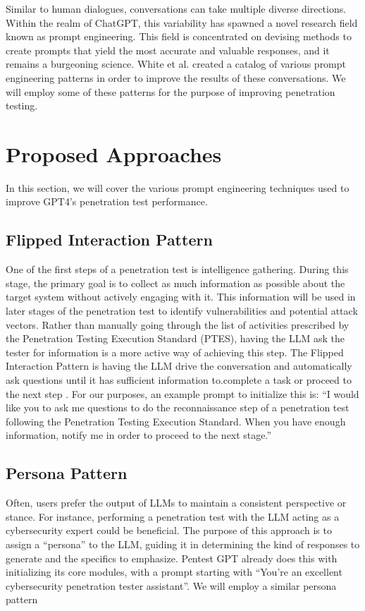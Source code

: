 \documentclass[conference]{IEEEtran}
\begin{document}
Similar to human dialogues, conversations can take multiple diverse directions. Within the realm of ChatGPT, this variability has spawned a novel research field known as prompt engineering. This field is concentrated on devising methods to create prompts that yield the most accurate and valuable responses, and it remains a burgeoning science. White et al. created a catalog of various prompt engineering patterns in order to improve the results of these conversations\cite{white2023prompt}. We will employ some of these patterns for the purpose of improving penetration testing.

\section{Proposed Approaches} \label{sec:approach}
In this section, we will cover the various prompt engineering techniques used to improve GPT4's penetration test performance.

\subsection{Flipped Interaction Pattern} \label{ssec:flipped}
One of the first steps of a penetration test is intelligence gathering\cite{ptes}. During this stage, the primary goal is to collect as much information as possible about the target system without actively engaging with it. This information will be used in later stages of the penetration test to identify vulnerabilities and potential attack vectors. Rather than manually going through the list of activities prescribed by the Penetration Testing Execution Standard (PTES), having the LLM ask the tester for information is a more active way of achieving this step. The Flipped Interaction Pattern is having the LLM drive the conversation and automatically ask questions until it has sufficient information to.complete a task or proceed to the next step \cite{white2023prompt}. For our purposes, an example prompt to initialize this is: “I would like you to ask me questions to do the reconnaissance step of a penetration test following the Penetration Testing Execution Standard. When you have enough information, notify me in order to proceed to the next stage.”

\subsection{Persona Pattern} \label{ssec:persona}
Often, users prefer the output of LLMs to maintain a consistent perspective or stance. For instance, performing a penetration test with the LLM acting as a cybersecurity expert could be beneficial. The purpose of this approach is to assign a “persona” to the LLM, guiding it in determining the kind of responses to generate and the specifics to emphasize\cite{white2023prompt}. Pentest GPT already does this with initializing its core modules, with a prompt starting with “You're an excellent cybersecurity penetration tester assistant”\cite{deng2023pentestgpt}. We will employ a similar persona pattern
\end{document}
